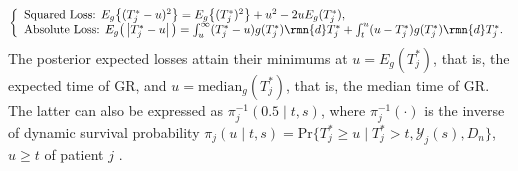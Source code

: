 \begin{eqnarray*}
\left \{
\begin{array}{l}
\mbox{Squared Loss: } E_g\big\{(T^*_j - u)^2\big\}=E_g\big\{(T^*_j)^2\big\} + u^2 -2uE_g(T^*_j),\\
\mbox{Absolute Loss: } E_g\big(\left|{T^*_j - u}\right|\big)= \int_u^\infty (T^*_j - u) g(T^*_j)\rmn{d} T^*_j + \int_t^u (u - T^*_j) g(T^*_j)\rmn{d} T^*_j.\\
\end{array}
\right.
\end{eqnarray*}
The posterior expected losses attain their minimums at $u = E_g(T^*_j)$, that is, the expected time of GR, and $u=\mbox{median}_g(T^*_j)$, that is, the median time of GR. The latter can also be expressed as $\pi_j^{-1}(0.5 \mid t,s)$, where $\pi_j^{-1}(\cdot)$ is the inverse of dynamic survival probability $\pi_j(u \mid t, s) =\mbox{Pr}\big\{T^*_j \geq u \mid  T^*_j >t, \mathcal{Y}_j(s), D_n\big\}$, $u \geq t$ of patient $j$ \citep{rizopoulos2011dynamic}. 

